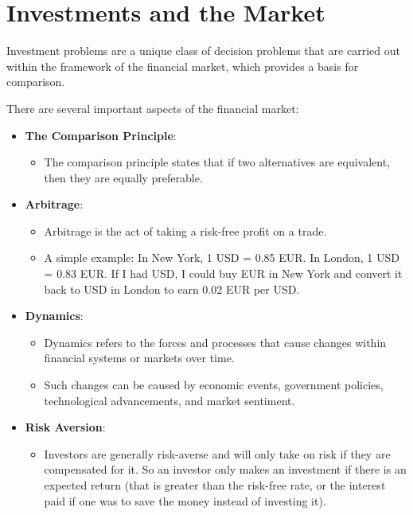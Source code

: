 \section{Investments and the Market}

Investment problems are a unique class of decision problems that are carried out within the framework of the financial market, which provides a basis for comparison. 

There are several important aspects of the financial market:
\begin{itemize}
    \item \textbf{The Comparison Principle}: 
    \begin{itemize}
        \item The comparison principle states that if two alternatives are equivalent, then they are equally preferable.
    \end{itemize}
    \item \textbf{Arbitrage}:
    \begin{itemize}
        \item Arbitrage is the act of taking a risk-free profit on a trade.
        \item A simple example: In New York, 1 USD = 0.85 EUR. In London, 1 USD = 0.83 EUR. If I had USD, I could buy EUR in New York and convert it back to USD in London to earn 0.02 EUR per USD. 
    \end{itemize}
    \item \textbf{Dynamics}:
    \begin{itemize}
        \item Dynamics refers to the forces and processes that cause changes within financial systems or markets over time.
        \item Such changes can be caused by economic events, government policies, technological advancements, and market sentiment.
    \end{itemize}
    \item \textbf{Risk Aversion}:
    \begin{itemize}
        \item Investors are generally risk-averse and will only take on risk if they are compensated for it. So an investor only makes an investment if there is an expected return (that is greater than the risk-free rate, or the interest paid if one was to save the money instead of investing it).
    \end{itemize}
\end{itemize}

